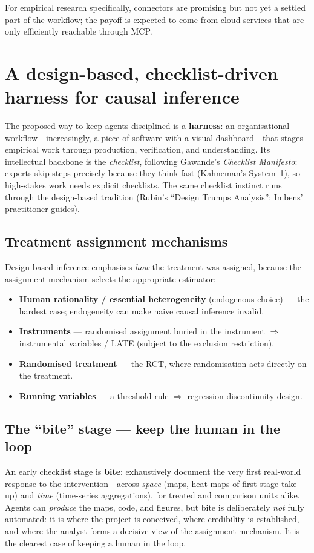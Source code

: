 \documentclass[11pt]{article}
\begin{document}
For empirical research specifically, connectors are promising but not yet a
settled part of the workflow; the payoff is expected to come from cloud services
that are only efficiently reachable through MCP.

\section{A design-based, checklist-driven harness for causal inference}

The proposed way to keep agents disciplined is a \textbf{harness}: an
organisational workflow---increasingly, a piece of software with a visual
dashboard---that stages empirical work through production, verification, and
understanding. Its intellectual backbone is the \emph{checklist}, following
Gawande's \emph{Checklist Manifesto}: experts skip steps precisely because they
think fast (Kahneman's System~1), so high-stakes work needs explicit checklists.
The same checklist instinct runs through the design-based tradition (Rubin's
``Design Trumps Analysis''; Imbens' practitioner guides).

\subsection{Treatment assignment mechanisms}
Design-based inference emphasises \emph{how} the treatment was assigned, because
the assignment mechanism selects the appropriate estimator:
\begin{itemize}[leftmargin=1.6em, itemsep=1pt]
  \item \textbf{Human rationality / essential heterogeneity} (endogenous choice)
  --- the hardest case; endogeneity can make naive causal inference invalid.
  \item \textbf{Instruments} --- randomised assignment buried in the instrument
  $\Rightarrow$ instrumental variables / LATE (subject to the exclusion
  restriction).
  \item \textbf{Randomised treatment} --- the RCT, where randomisation acts
  directly on the treatment.
  \item \textbf{Running variables} --- a threshold rule $\Rightarrow$ regression
  discontinuity design.
\end{itemize}

\subsection{The ``bite'' stage --- keep the human in the loop}
An early checklist stage is \textbf{bite}: exhaustively document the very first
real-world response to the intervention---across \emph{space} (maps, heat maps of
first-stage take-up) and \emph{time} (time-series aggregations), for treated and
comparison units alike. Agents can \emph{produce} the maps, code, and figures,
but bite is deliberately \emph{not} fully automated: it is where the project is
conceived, where credibility is established, and where the analyst forms a
decisive view of the assignment mechanism. It is the clearest case of keeping a
human in the loop.
\end{document}
